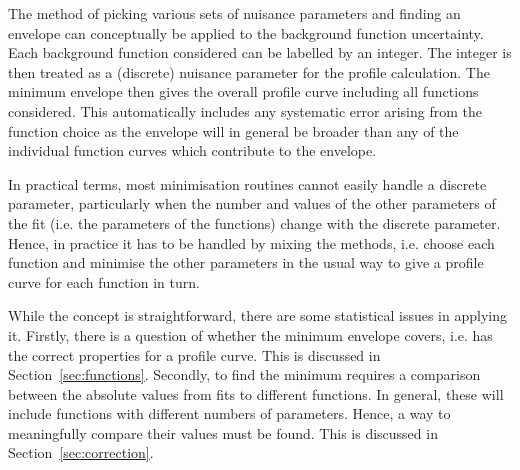 The method of picking various sets of nuisance parameters and finding
an envelope can conceptually be applied to the background function
uncertainty. Each background function considered can be labelled by an
integer. The integer is then treated as a (discrete) nuisance parameter
for the profile calculation.
The minimum envelope then gives the overall profile curve including
all functions considered. This automatically includes any systematic error
arising from the function choice as the envelope will in general be broader
than any of the individual function curves which contribute to the envelope.

In practical terms, most minimisation routines 
cannot easily handle a discrete parameter, particularly when the
number and values of the other parameters of the fit (i.e. the parameters
of the functions) change with the discrete parameter.
Hence, in practice it has
to be handled by mixing the methods, i.e. choose each function and minimise
the other parameters in the usual way to give a profile curve for each function
in turn. 

While the concept is straightforward, there are some statistical
issues in applying it.
Firstly, there is a question of whether the \nll minimum envelope covers,
i.e. has the correct properties for a profile curve.
This is discussed in Section~\ref{sec:functions}.
Secondly, to find the minimum requires a
comparison between the absolute \nll values from fits to different functions.
In general, these will include functions with different numbers of parameters.
Hence, a way to meaningfully compare their \nll values must be found.
This is discussed in Section~\ref{sec:correction}.

